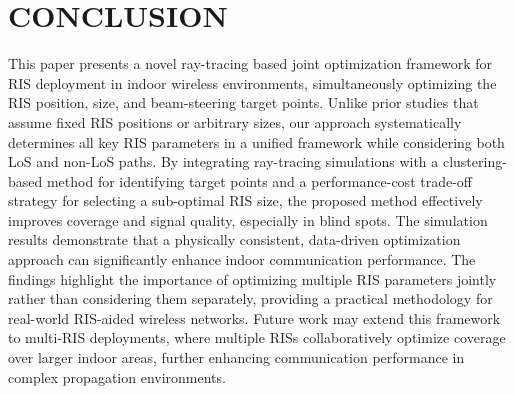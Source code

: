 \documentclass{IEEEoj}
\begin{document}
\section{CONCLUSION} \label{sec:conclusion}
This paper presents a novel ray-tracing based joint optimization framework for RIS deployment in indoor wireless environments, simultaneously optimizing the RIS position, size, and beam-steering target points. Unlike prior studies that assume fixed RIS positions or arbitrary sizes, our approach systematically determines all key RIS parameters in a unified framework while considering both LoS and non-LoS paths. By integrating ray-tracing simulations with a clustering-based method for identifying target points and a performance-cost trade-off strategy for selecting a sub-optimal RIS size, the proposed method effectively improves coverage and signal quality, especially in blind spots. The simulation results demonstrate that a physically consistent, data-driven optimization approach can significantly enhance indoor communication performance. The findings highlight the importance of optimizing multiple RIS parameters jointly rather than considering them separately, providing a practical methodology for real-world RIS-aided wireless networks. Future work may extend this framework to multi-RIS deployments, where multiple RISs collaboratively optimize coverage over larger indoor areas, further enhancing communication performance in complex propagation environments.
\end{document}
